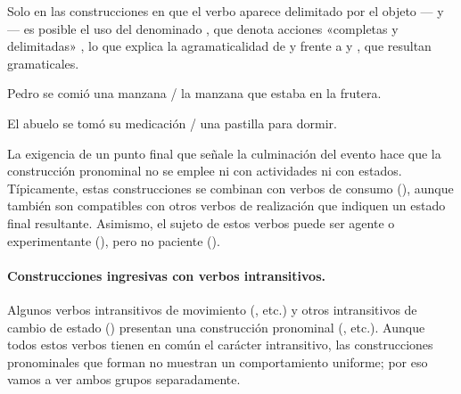 Solo en las construcciones en que el verbo aparece delimitado por el objeto
--- y --- es posible el uso del
denominado  , que denota acciones «completas y
delimitadas» \parencite[111]{sanchezlopez2002}, lo que explica la
agramaticalidad de  y  frente a
 y , que resultan
gramaticales.

\begin{exe}
  \ex
    \begin{xlist}
      \ex\label{ex:10-secome-b} Pedro se comió una manzana / la manzana que
          estaba en la frutera.
    \end{xlist}
  \ex
    \begin{xlist}
      \ex\label{ex:10-setoma-b} El abuelo se tomó su medicación / una pastilla
          para dormir.
    \end{xlist}
\end{exe}

La exigencia de un punto final que señale la culminación del evento hace que la
construcción pronominal no se emplee ni con actividades ni con estados.
Típicamente, estas construcciones se combinan con verbos de consumo
(), aunque también son compatibles con otros
verbos de realización que indiquen un estado final resultante. Asimismo, el
sujeto de estos verbos puede ser agente o experimentante (), pero no paciente ().

\paragraph{Construcciones ingresivas con verbos intransitivos.} Algunos verbos
intransitivos de movimiento (, etc.) y otros intransitivos de cambio de estado
() presentan una construcción pronominal
(, etc.).
Aunque todos estos verbos tienen en común el carácter intransitivo, las
construcciones pronominales que forman no muestran un comportamiento uniforme;
por eso vamos a ver ambos grupos separadamente.

